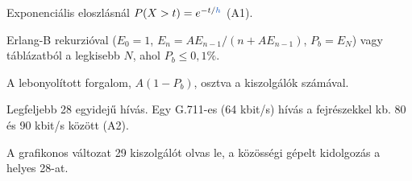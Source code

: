 

\begin{center}\end{center}

Exponenciális eloszlásnál $P(X>t)=e^{-t/{\ca{h}}}$ (A1).

\begin{center}\end{center}

Erlang-B rekurzióval ($E_0=1$, $E_n=AE_{n-1}/(n+AE_{n-1})$, $P_b=E_N$) vagy táblázatból a legkisebb $N$, ahol $P_b\le0{,}1\%$.

\begin{center}\end{center}

A lebonyolított forgalom, $A(1-P_b)$, osztva a kiszolgálók számával.

\begin{center}\end{center}

Legfeljebb 28 egyidejű hívás. Egy G.711-es (64 kbit/s) hívás a fejrészekkel kb. 80 és 90 kbit/s között (A2).

\begin{center}\end{center}
\begin{figyelem}[Javítás]
A grafikonos változat 29 kiszolgálót olvas le, a közösségi gépelt kidolgozás a helyes 28-at.
\end{figyelem}
\begin{eredmeny}

\begin{center}\end{center}
\end{eredmeny}


